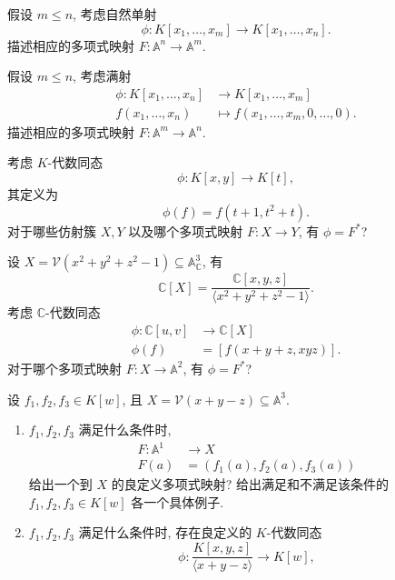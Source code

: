 \BookExerciseHeading
\begin{BookExercises}
  \item\label{ex:inverse-pullback-of-natural-inclusion} 假设 $m\leq n$, 考虑自然单射
    \[
      \phi:K[x_{1},\ldots,x_{m}]\to K[x_{1},\ldots,x_{n}].
    \]
    描述相应的多项式映射 $F:\mathbb{A}^{n}\to\mathbb{A}^{m}$.
  \item\label{ex:inverse-pullback-of-specialization} 假设 $m\leq n$, 考虑满射
    \[
      \begin{aligned}
        \phi:K[x_{1},\ldots,x_{n}]&\to K[x_{1},\ldots,x_{m}]\\
        f(x_{1},\ldots,x_{n})&\mapsto f(x_{1},\ldots,x_{m},0,\ldots,0).
      \end{aligned}
    \]
    描述相应的多项式映射 $F:\mathbb{A}^{m}\to\mathbb{A}^{n}$.
  \item\label{ex:inverse-pullback-into-affine-plane} 考虑 $K$-代数同态
    \[
      \phi:K[x,y]\to K[t],
    \]
    其定义为
    \[
      \phi(f)=f(t+1,t^{2}+t).
    \]
    对于哪些仿射簇 $X,Y$ 以及哪个多项式映射 $F:X\to Y$, 有 $\phi=F^{*}$?
  \item\label{ex:inverse-pullback-from-quadric} 设 $X=\mathcal{V}(x^{2}+y^{2}+z^{2}-1)\subseteq\mathbb{A}^{3}_{\mathbb{C}}$, 有
    \[
      \mathbb{C}[X]=\frac{\mathbb{C}[x,y,z]}{\langle x^{2}+y^{2}+z^{2}-1\rangle}.
    \]
    考虑 $\mathbb{C}$-代数同态
    \[
      \begin{aligned}
        \phi:\mathbb{C}[u,v]&\to\mathbb{C}[X]\\
        \phi(f)&=[f(x+y+z,xyz)].
      \end{aligned}
    \]
    对于哪个多项式映射 $F:X\to\mathbb{A}^{2}$, 有 $\phi=F^{*}$?
  \item\label{ex:pullback-bijection-for-plane} 设 $f_{1},f_{2},f_{3}\in K[w]$, 且 $X=\mathcal{V}(x+y-z)\subseteq\mathbb{A}^{3}$.
    \begin{enumerate}[label=(\alph*)]
      \item $f_{1},f_{2},f_{3}$ 满足什么条件时,
        \[
          \begin{aligned}
            F:\mathbb{A}^{1}&\to X\\
            F(a)&=(f_{1}(a),f_{2}(a),f_{3}(a))
          \end{aligned}
        \]
        给出一个到 $X$ 的良定义多项式映射? 给出满足和不满足该条件的 $f_{1},f_{2},f_{3}\in K[w]$ 各一个具体例子.
      \item $f_{1},f_{2},f_{3}$ 满足什么条件时, 存在良定义的 $K$-代数同态
        \[
          \phi:\frac{K[x,y,z]}{\langle x+y-z\rangle}\to K[w],
\]
\end{enumerate}
\end{BookExercises}
